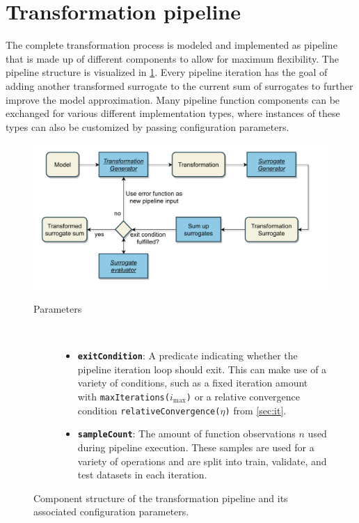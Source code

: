 \documentclass[
  a4paper,  %
  twoside,  %
  bibliography=totoc,
  headsepline,
  cleardoublepage=empty,
  parskip=half,
  draft=false
]{scrbook}
\begin{document}
\newpage
\section{Transformation pipeline}
\label{sec:tp}

The complete transformation process is modeled and implemented as pipeline that is made up of different components to allow for maximum flexibility.
The pipeline structure is visualized in \cref{fig:tp}.
Every pipeline iteration has the goal of adding another transformed surrogate to the current sum of surrogates to further improve the model approximation.
Many pipeline function components can be exchanged for various different implementation types, where instances of these types can also be customized by passing configuration parameters.

\begin{mdframed}[style=style,frametitle={Transformation Pipeline}]
\begin{figure}[H]

\includegraphics[width=\textwidth]{graphics/TransformationPipeline.pdf}
\vspace{-7.5mm}

\delimit
\vspace{1.5mm}

\begin{description}
\item[Parameters] {~ \begin{itemize}[\indent{}]
\item \texttt{\textbf{exitCondition}}: A predicate indicating whether the pipeline iteration loop should exit. This can make use of a variety of conditions, such as a fixed iteration amount with \texttt{maxIterations($i_{\mathrm{max}}$)} or a relative convergence condition \texttt{relativeConvergence($\eta$)} from \cref{sec:it}.
\item \texttt{\textbf{sampleCount}}: The amount of function observations $n$ used during pipeline execution. These samples are used for a variety of operations and are split into train, validate, and test datasets in each iteration.
\end{itemize}}
\end{description}

\delimit

\caption{Component structure of the transformation pipeline and its associated configuration parameters.}
\label{fig:tp}
\end{figure}
\end{mdframed}
\end{document}
